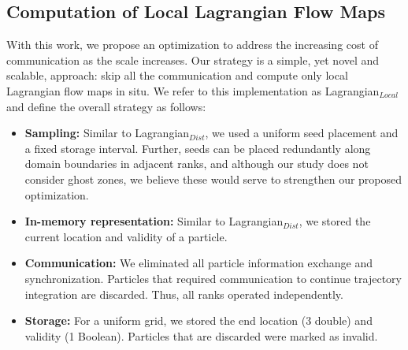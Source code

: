 \subsection{Computation of Local Lagrangian Flow Maps}
\label{sec:local}
%
%
%
%
%
With this work, we propose an optimization to address the increasing cost of communication as the scale increases.
%
Our strategy is a simple, yet novel and scalable, approach: skip all the communication and compute only local Lagrangian flow maps in situ. 
%
We refer to this implementation as Lagrangian$_{Local}$ and define the overall strategy as follows:
\begin{itemize}[leftmargin=*]
\item\textbf{Sampling:} Similar to Lagrangian$_{Dist}$, we used a uniform seed placement and a fixed storage interval.
%
Further, seeds can be placed redundantly along domain boundaries in adjacent ranks, and although our study does not consider ghost zones, we believe these would serve to strengthen our proposed optimization.
%
\item\textbf{In-memory representation:} Similar to Lagrangian$_{Dist}$, we stored the current location and validity of a particle.
%
\item\textbf{Communication:} We eliminated all particle information exchange and synchronization. Particles that required communication to continue trajectory integration are discarded. Thus, all ranks operated independently.
%
\item\textbf{Storage:} For a uniform grid, we stored the end location (3 double) and validity (1 Boolean). Particles that are discarded were marked as invalid. 
%
\end{itemize}

